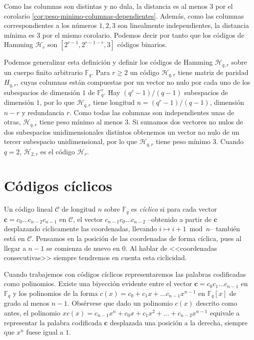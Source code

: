 Como las columnas son distintas y no dula, la distancia es al menos \(3\) por el corolario \ref{cor:peso-minimo-columnas-dependientes}.
Además, como las columnas correspondientes a los números \(1, 2, 3\) son linealmente independientes, la distancia mínima es 3 por el mismo corolario.
Podemos decir por tanto que los códigos de Hamming \(\mathcal H_r\) son \([2^{r-1}, 2^{r-1-r}, 3]\) códigos binarios.

Podemos generalizar esta definición y definir los códigos de Hamming \(\mathcal H_{q,r}\) sobre un cuerpo finito arbitrario \(\mathbb F_q\). 
Para \(r \geq 2\) un código \(\mathcal H_{q,r}\) tiene matriz de paridad \(H_{q,r}\), cuyas columnas están compuestas por un vector no nulo por cada uno de los subespacios de dimensión \(1\) de \(\mathbb F_q^r\).
Hay \((q^r-1)/(q-1)\) subespacios de dimensión \(1\), por lo que \(\mathcal H_{q,r}\) tiene longitud \(n = (q^r-1)/(q-1)\), dimensión \(n-r\) y redundancia \(r\).
Como todas las columnas son independientes unas de otras, \(\mathcal H_{q,r}\) tiene peso mínimo al menos 3.
Si sumamos dos vectores no nulos de dos subespacios unidimensionales distintos obtenemos un vector no nulo de un tercer subespacio unidimensional, por lo que \(\mathcal H_{q,r}\) tiene peso mínimo 3. 
Cuando \(q = 2\), \(\mathcal H_{2,r}\) es el código \(\mathcal H_r\).


\section{Códigos cíclicos}

Un código lineal \(\mathcal C\) de longitud \(n\) sobre \(\mathbb F_q\) es \textit{cíclico} si para cada vector \(\mathbf c = c_0\dots c_{n-2}c_{n-1}\) en \(\mathcal C\), el vector \(c_{n-1}c_0\dots c_{n-2}\) --obtenido a partir de \(\mathbf c\) desplazando cíclicamente las coordenadas, llevando \(i \mapsto i +1 \bmod n\)-- también está en \(\mathcal C\).
Pensamos en la posición de las coordenadas de forma cíclica, pues al llegar a \(n -1\) se comienza de nuevo en \(0\).
Al hablar de <<coordenadas consecutivas>> siempre tendremos en cuenta esta ciclicidad.


Cuando trabajemos con códigos cíclicos representaremos las palabras codificadas como polinomios.
Existe una biyección evidente entre el vector \(\mathbf c = c_0c_1\dots c_{n-1}\) en \(\mathbb F_q\) y los polinomios de la forma \(c(x) = c_0 + c_1x + \dots c_{n-1}x^{n-1}\) en \(\mathbb F_q[x]\) de grado al menos \(n-1\).
Obsérvese que dado un polinomio \(c(x)\) descrito como antes, el polinomio \(xc(x) = c_{n-1}x^n + c_0x + c_1x^2 + \dots + c_{n-2}x^{n-1}\) equivale a representar la palabra codificada \(\mathbf c\) desplazada una posición a la derecha, siempre que \(x^n\) fuese igual a \(1\).

